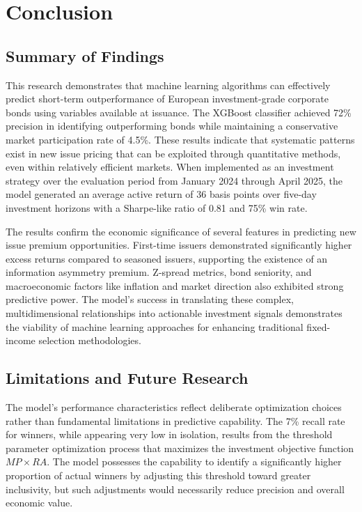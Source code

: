 \chapter{Conclusion}
\label{ch:conclusion}

\section{Summary of Findings}

This research demonstrates that machine learning algorithms can effectively predict short-term outperformance of European investment-grade corporate bonds using variables available at issuance. The XGBoost classifier achieved 72\% precision in identifying outperforming bonds while maintaining a conservative market participation rate of 4.5\%. These results indicate that systematic patterns exist in new issue pricing that can be exploited through quantitative methods, even within relatively efficient markets. When implemented as an investment strategy over the evaluation period from January 2024 through April 2025, the model generated an average active return of 36 basis points over five-day investment horizons with a Sharpe-like ratio of 0.81 and 75\% win rate.

The results confirm the economic significance of several features in predicting new issue premium opportunities. First-time issuers demonstrated significantly higher excess returns compared to seasoned issuers, supporting the existence of an information asymmetry premium. Z-spread metrics, bond seniority, and macroeconomic factors like inflation and market direction also exhibited strong predictive power. The model's success in translating these complex, multidimensional relationships into actionable investment signals demonstrates the viability of machine learning approaches for enhancing traditional fixed-income selection methodologies.

\section{Limitations and Future Research}

The model's performance characteristics reflect deliberate optimization choices rather than fundamental limitations in predictive capability. The 7\% recall rate for winners, while appearing very low in isolation, results from the threshold parameter optimization process that maximizes the investment objective function $MP \times RA$. The model possesses the capability to identify a significantly higher proportion of actual winners by adjusting this threshold toward greater inclusivity, but such adjustments would necessarily reduce precision and overall economic value.

